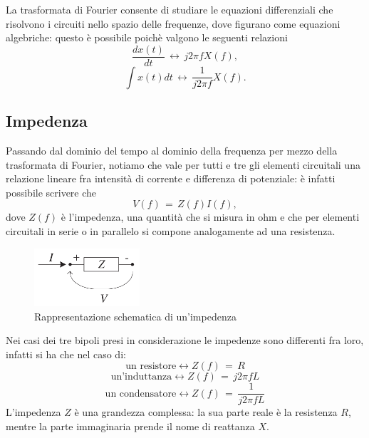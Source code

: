 La trasformata di Fourier consente di studiare le equazioni differenziali che risolvono i circuiti nello spazio delle frequenze, 
dove figurano come equazioni algebriche: questo è possibile poichè valgono le seguenti relazioni
\begin{equation}
    \frac{dx\left(t\right)}{dt}\,\longleftrightarrow\,j2\pi fX\left(f\right),
    \label{equation: fourierDerivata}
\end{equation}
\begin{equation}
    \int x\left(t\right)dt\,\longleftrightarrow\,\frac{1}{j2\pi f}X\left(f\right).
    \label{equation: fourierIntegrale}
\end{equation}

\subsection{Impedenza}

Passando dal dominio del tempo al dominio della frequenza per mezzo della trasformata di Fourier, notiamo che vale per tutti
e tre gli elementi circuitali una relazione lineare fra intensità di corrente e differenza di potenziale: è infatti possibile
scrivere che
\begin{equation}
    V\left(f\right)\,=\,Z\left(f\right)I\left(f\right),
    \label{equation: impedenza}
\end{equation}
dove $Z\left(f\right)$ è l'impedenza, una quantità che si misura in ohm e che per elementi circuitali in serie o in parallelo
si compone analogamente ad una resistenza.
\begin{figure}[H]
    \centering
    \includegraphics[width=0.35\textwidth]{Immagini/Impedenza.png}
    \caption{Rappresentazione schematica di un'impedenza}
    \label{figure: Impedenza}
\end{figure}
Nei casi dei tre bipoli presi in considerazione le impedenze sono differenti fra loro, infatti si ha che nel caso di:
\begin{equation}
    \text{un resistore} \longleftrightarrow Z\left(f\right)\,=\,R
    \label{equation: impedenzaR}
\end{equation}
\begin{equation}
    \text{un'induttanza} \longleftrightarrow Z\left(f\right)\,=\,j2\pi fL
    \label{equation: impedenzaL}
\end{equation}
\begin{equation}
    \text{un condensatore} \longleftrightarrow Z\left(f\right)\,=\,\frac{1}{j2\pi fL}
    \label{equation: impedenzaC}
\end{equation}
L'impedenza $Z$ è una grandezza complessa: la sua parte reale è la resistenza $R$, mentre la parte immaginaria prende il
nome di reattanza $X$.

